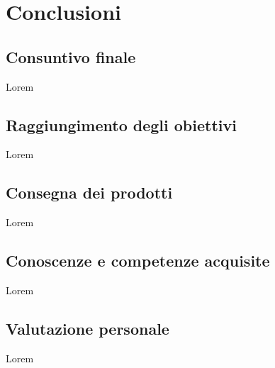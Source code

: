 
\chapter{Conclusioni}
\label{cap:conclusioni}

\section{Consuntivo finale}

Lorem

\section{Raggiungimento degli obiettivi}

Lorem

\section{Consegna dei prodotti}

Lorem

\section{Conoscenze e competenze acquisite}

Lorem

\section{Valutazione personale}

Lorem
